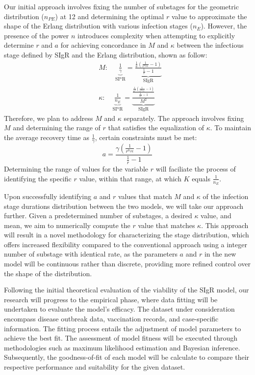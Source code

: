\documentclass[12pt]{article}
\begin{document}
\par
Our initial approach involves fixing the number of substages for the geometric distribution ($n_{PE}$) at 12 and determining the optimal $r$ value to approximate the shape of the Erlang distribution with various infection stages ($n_E$). However, the presence of the power $n$ introduces complexity when attempting to explicitly determine $r$ and $a$ for achieving concordance in $M$ and $\kappa$ between the infectious stage defined by SIgR and the Erlang distribution, shown as follow: 
\begin{align*}
    &M: \quad \underbrace{\frac{1}{\gamma}}_{\text{SI$^n$R}} = \underbrace{\frac{\frac{1}{a} (\frac{1}{r^{n_{PE}}}-1)}{\frac{1}{r}-1}}_{\text{SIgR}} \\
    &\kappa: \quad \underbrace{\frac{1}{n_E}}_{\text{SI$^n$R}} = \underbrace{\frac{\frac{\frac{1}{a^2} (\frac{1}{r^{2n_{PE}}}-1)}{\frac{1}{r^2}-1}}{M^2}}_{\text{SIgR}}
\end{align*}
Therefore, we plan to address $M$ and $\kappa$ separately. The approach involves fixing $M$ and determining the range of $r$ that satisfies the equalization of $\kappa$. To maintain the average recovery time as $\frac{1}{\gamma}$, certain constraints must be met: 
\begin{equation*}
    a = \frac{\gamma (\frac{1}{r^{n_{PE}}}-1)}{\frac{1}{r}-1}
\end{equation*}
Determining the range of values for the variable $r$ will faciliate the process of identifying the specific $r$ value, within that range, at which $K$ equals $\frac{1}{n_E}$.

\par
Upon successfully identifying $a$ and $r$ values that match $M$ and $\kappa$ of the infection stage durations distribution between the two models, we will take our approach further. Given a predetermined number of substages, a desired $\kappa$ value, and mean, we aim to numerically compute the $r$ value that matches $\kappa$. This approach will result in a novel methodology for characterizing the stage distribution, which offers increased flexibility compared to the conventional approach using a integer number of substage with identical rate, as the parameters $a$ and $r$ in the new model will be continuous rather than discrete, providing more refined control over the shape of the distribution.
\par
Following the initial theoretical evaluation of the viability of the SIgR model, our research will progress to the empirical phase, where data fitting will be undertaken to evaluate the model's efficacy. The dataset under consideration encompass disease outbreak data, vaccination records, and case-specific information. The fitting process entails the adjustment of model parameters to achieve the best fit. The assessment of model fitness will be executed through methodologies such as maximum likelihood estimation and Bayesian inference. Subsequently, the goodness-of-fit of each model will be calculate to compare their respective performance and suitability for the given dataset.
\end{document}
